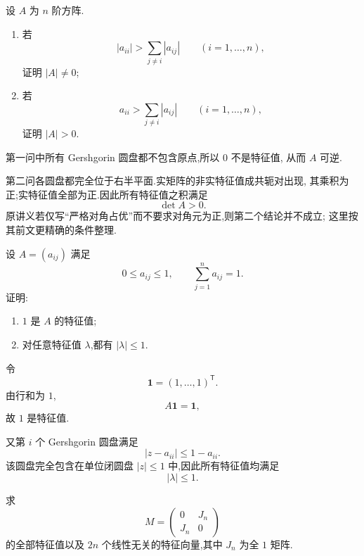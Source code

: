 \begin{example}
设 $A$ 为 $n$ 阶方阵.
\begin{enumerate}
    \item 若
    \[
    |a_{ii}|>\sum\limits_{j\neq i}|a_{ij}|
    \qquad(i=1,\ldots,n),
    \]
    证明 $|A|\neq0$;
    \item 若
    \[
    a_{ii}>\sum\limits_{j\neq i}|a_{ij}|
    \qquad(i=1,\ldots,n),
    \]
    证明 $|A|>0$.
\end{enumerate}
\end{example}
\exampleblank

\begin{solution}
第一问中所有 Gershgorin 圆盘都不包含原点,所以 $0$ 不是特征值,
从而 $A$ 可逆.

第二问各圆盘都完全位于右半平面.实矩阵的非实特征值成共轭对出现,
其乘积为正;实特征值全部为正.因此所有特征值之积满足
\[
\boxed{\det A>0}.
\]
原讲义若仅写``严格对角占优''而不要求对角元为正,则第二个结论并不成立;
这里按其前文更精确的条件整理.
\end{solution}


\begin{example}
设 $A=(a_{ij})$ 满足
\[
0\leq a_{ij}\leq1,
\qquad
\sum\limits_{j=1}^{n}a_{ij}=1.
\]
证明:
\begin{enumerate}
    \item $1$ 是 $A$ 的特征值;
    \item 对任意特征值 $\lambda$,都有 $|\lambda|\leq1$.
\end{enumerate}
\end{example}
\exampleblank

\begin{solution}
令
\[
\boldsymbol{1}=(1,\ldots,1)^{\mathsf T}.
\]
由行和为 $1$,
\[
A\boldsymbol{1}=\boldsymbol{1},
\]
故 $1$ 是特征值.

又第 $i$ 个 Gershgorin 圆盘满足
\[
|z-a_{ii}|
\leq
1-a_{ii}.
\]
该圆盘完全包含在单位闭圆盘 $|z|\leq1$ 中,因此所有特征值均满足
\[
|\lambda|\leq1.
\]
\end{solution}


\begin{example}[\markstar]
求
\[
M=
\begin{pmatrix}
0&J_n\\
J_n&0
\end{pmatrix}
\]
的全部特征值以及 $2n$ 个线性无关的特征向量,其中 $J_n$ 为全 $1$ 矩阵.
\end{example}
\exampleblank

